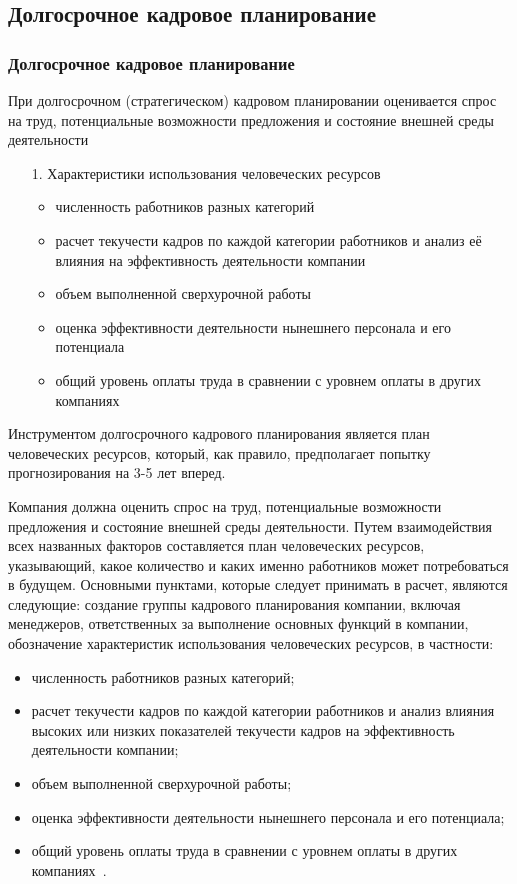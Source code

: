 \documentclass{../industrial-development}
\begin{document}
\subsection{Долгосрочное кадровое планирование}
\begin{frame} \frametitle{Долгосрочное кадровое планирование}

При долгосрочном (стратегическом) кадровом планировании оценивается спрос на труд, потенциальные возможности предложения и состояние внешней среды деятельности

	 \begin{itemize}
\item[1.] Характеристики использования человеческих ресурсов
  \begin{itemize}
		\item	численность работников разных категорий
		\item	расчет текучести кадров по каждой категории работников и анализ её влияния на эффективность деятельности компании
		\item объем выполненной сверхурочной работы
		\item оценка эффективности деятельности нынешнего персонала и его потенциала
		\item	общий уровень оплаты труда в сравнении с уровнем оплаты в других компаниях
  \end{itemize}
  \end{itemize}
\end{frame}

\lecturenotes

Инструментом долгосрочного кадрового планирования является план человеческих ресурсов, который, как правило, предполагает попытку прогнозирования на 3-5 лет вперед.

Компания должна оценить спрос на труд, потенциальные возможности предложения и состояние внешней среды деятельности. Путем взаимодействия всех названных факторов составляется план человеческих ресурсов, указывающий, какое количество и
каких именно работников может потребоваться в будущем. Основными пунктами, которые следует принимать в расчет, являются следующие: создание группы кадрового планирования компании, включая менеджеров, ответственных за выполнение основных функций в компании, обозначение характеристик использования человеческих ресурсов, в частности:
 \begin{itemize}
\item численность работников разных категорий;
\item расчет текучести кадров по каждой категории работников и анализ влияния высоких
или низких показателей текучести кадров на эффективность деятельности компании;
\item объем выполненной сверхурочной работы;
\item оценка эффективности деятельности нынешнего персонала и его потенциала;
\item общий уровень оплаты труда в сравнении с уровнем оплаты в других компаниях~\cite[с.~86]{Ivanova}.
  \end{itemize}
\end{document}
